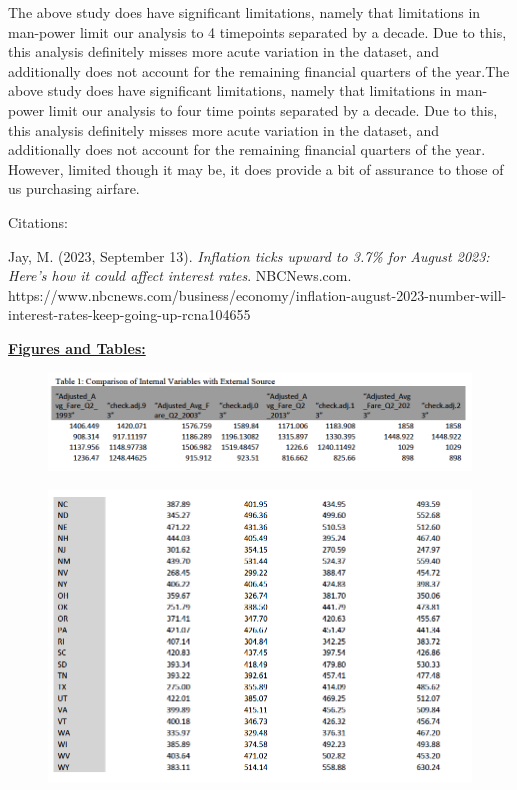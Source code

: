 \documentclass[
  letterpaper,
  DIV=11,
  numbers=noendperiod]{scrartcl}
\begin{document}
The above study does have significant limitations, namely that
limitations in man-power limit our analysis to 4 timepoints separated by
a decade. Due to this, this analysis definitely misses more acute
variation in the dataset, and additionally does not account for the
remaining financial quarters of the year.The above study does have
significant limitations, namely that limitations in man-power limit our
analysis to four time points separated by a decade. Due to this, this
analysis definitely misses more acute variation in the dataset, and
additionally does not account for the remaining financial quarters of
the year. However, limited though it may be, it does provide a bit of
assurance to those of us purchasing airfare.

Citations:

Jay, M. (2023, September 13). \emph{Inflation ticks upward to 3.7\% for
August 2023: Here's how it could affect interest rates}. NBCNews.com.
https://www.nbcnews.com/business/economy/inflation-august-2023-number-will-interest-rates-keep-going-up-rcna104655

\ul{\textbf{Figures and Tables:}}

\begin{figure}

{\centering \includegraphics{images/Table1.png}

}

\end{figure}

\begin{figure}

{\centering \includegraphics{images/Table2b.png}

}

\end{figure}
\end{document}
